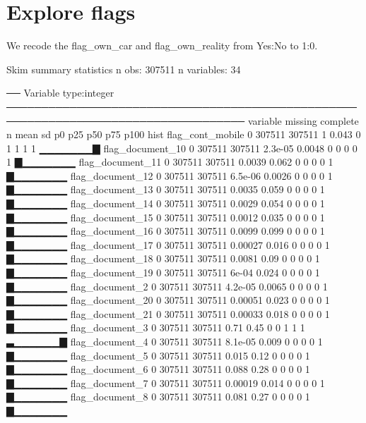 \documentclass[a4paper]{article}
\begin{document}
\section{Explore flags}
We recode the flag\_own\_car and flag\_own\_reality from Yes:No to 1:0.
\begin{Schunk}
\begin{Soutput}
Skim summary statistics
 n obs: 307511 
 n variables: 34 

── Variable type:integer ────────────────────────────────────────────────────────────────────────────────────
                    variable missing complete      n        mean     sd p0 p25 p50 p75 p100     hist
            flag_cont_mobile       0   307511 307511     1       0.043   0   1   1   1    1 ▁▁▁▁▁▁▁▇
            flag_document_10       0   307511 307511     2.3e-05 0.0048  0   0   0   0    1 ▇▁▁▁▁▁▁▁
            flag_document_11       0   307511 307511     0.0039  0.062   0   0   0   0    1 ▇▁▁▁▁▁▁▁
            flag_document_12       0   307511 307511     6.5e-06 0.0026  0   0   0   0    1 ▇▁▁▁▁▁▁▁
            flag_document_13       0   307511 307511     0.0035  0.059   0   0   0   0    1 ▇▁▁▁▁▁▁▁
            flag_document_14       0   307511 307511     0.0029  0.054   0   0   0   0    1 ▇▁▁▁▁▁▁▁
            flag_document_15       0   307511 307511     0.0012  0.035   0   0   0   0    1 ▇▁▁▁▁▁▁▁
            flag_document_16       0   307511 307511     0.0099  0.099   0   0   0   0    1 ▇▁▁▁▁▁▁▁
            flag_document_17       0   307511 307511     0.00027 0.016   0   0   0   0    1 ▇▁▁▁▁▁▁▁
            flag_document_18       0   307511 307511     0.0081  0.09    0   0   0   0    1 ▇▁▁▁▁▁▁▁
            flag_document_19       0   307511 307511 6e-04       0.024   0   0   0   0    1 ▇▁▁▁▁▁▁▁
             flag_document_2       0   307511 307511     4.2e-05 0.0065  0   0   0   0    1 ▇▁▁▁▁▁▁▁
            flag_document_20       0   307511 307511     0.00051 0.023   0   0   0   0    1 ▇▁▁▁▁▁▁▁
            flag_document_21       0   307511 307511     0.00033 0.018   0   0   0   0    1 ▇▁▁▁▁▁▁▁
             flag_document_3       0   307511 307511     0.71    0.45    0   0   1   1    1 ▃▁▁▁▁▁▁▇
             flag_document_4       0   307511 307511     8.1e-05 0.009   0   0   0   0    1 ▇▁▁▁▁▁▁▁
             flag_document_5       0   307511 307511     0.015   0.12    0   0   0   0    1 ▇▁▁▁▁▁▁▁
             flag_document_6       0   307511 307511     0.088   0.28    0   0   0   0    1 ▇▁▁▁▁▁▁▁
             flag_document_7       0   307511 307511     0.00019 0.014   0   0   0   0    1 ▇▁▁▁▁▁▁▁
             flag_document_8       0   307511 307511     0.081   0.27    0   0   0   0    1 ▇▁▁▁▁▁▁▁

\end{Soutput}
\end{Schunk}
\end{document}

